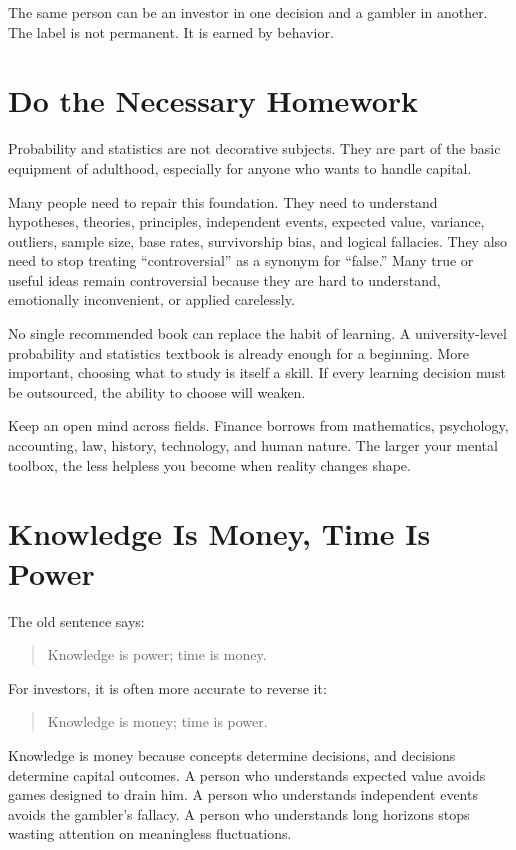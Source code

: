 The same person can be an investor in one decision and a gambler in another. The label is not permanent. It is earned by behavior.

\section*{Do the Necessary Homework}

Probability and statistics are not decorative subjects. They are part of the basic equipment of adulthood, especially for anyone who wants to handle capital.

Many people need to repair this foundation. They need to understand hypotheses, theories, principles, independent events, expected value, variance, outliers, sample size, base rates, survivorship bias, and logical fallacies. They also need to stop treating ``controversial'' as a synonym for ``false.'' Many true or useful ideas remain controversial because they are hard to understand, emotionally inconvenient, or applied carelessly.

No single recommended book can replace the habit of learning. A university-level probability and statistics textbook is already enough for a beginning. More important, choosing what to study is itself a skill. If every learning decision must be outsourced, the ability to choose will weaken.

Keep an open mind across fields. Finance borrows from mathematics, psychology, accounting, law, history, technology, and human nature. The larger your mental toolbox, the less helpless you become when reality changes shape.

\section*{Knowledge Is Money, Time Is Power}

The old sentence says:

\begin{quote}
Knowledge is power; time is money.
\end{quote}

For investors, it is often more accurate to reverse it:

\begin{quote}
Knowledge is money; time is power.
\end{quote}

Knowledge is money because concepts determine decisions, and decisions determine capital outcomes. A person who understands expected value avoids games designed to drain him. A person who understands independent events avoids the gambler's fallacy. A person who understands long horizons stops wasting attention on meaningless fluctuations.

